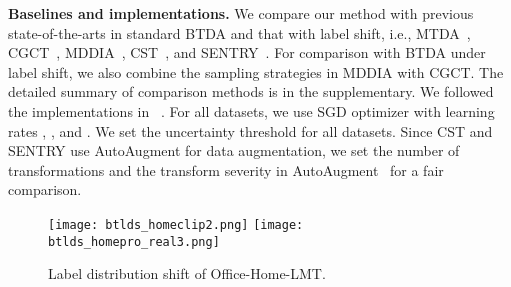 \documentclass[letterpaper]{article} \usepackage{aaai23}  \usepackage{times}  \usepackage{helvet}  \usepackage{courier}  \usepackage[hyphens]{url}  \usepackage{graphicx} \urlstyle{rm} \def\UrlFont{\rm}  \usepackage{natbib}  \usepackage{caption} \frenchspacing  \setlength{\pdfpagewidth}{8.5in}  \setlength{\pdfpageheight}{11in}
\begin{document}
\noindent\textbf{Baselines and implementations.}
We compare our method with previous state-of-the-arts in standard BTDA and that with label shift, i.e., MTDA~\cite{nguyen2021unsupervised}, CGCT~\cite{roy2021curriculum}, MDDIA~\cite{jiang2020implicit}, CST~\cite{liu2021cycle}, and SENTRY~\cite{prabhu2021sentry}. For comparison with BTDA under label shift, we also combine the sampling strategies in MDDIA with CGCT. The detailed summary of comparison methods is in the supplementary. We followed the implementations in ~\cite{dalib}. For all datasets, we use SGD optimizer with learning rates , , and . We set the uncertainty threshold  for all datasets. Since CST and SENTRY use AutoAugment for data augmentation, we set the number of transformations  and the transform severity  in AutoAugment~\cite{lim2019fast} for a fair comparison.

\begin{figure}[!htbp]
    \centering
    \texttt{[image: btlds\_homeclip2.png]}
    \texttt{[image: btlds\_homepro\_real3.png]}
\caption{Label distribution shift of Office-Home-LMT.}
\label{btda_lmt}
\end{figure}
\end{document}
